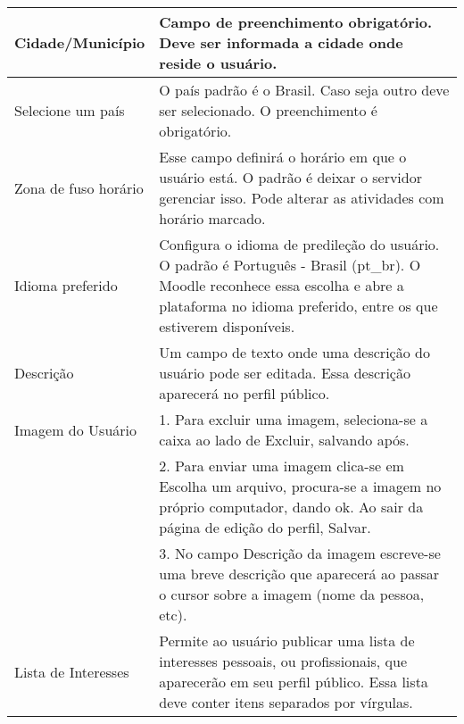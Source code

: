 \begin{longtable}{p{4cm}|p{9cm}}
%  
%  
 Cidade/Município & Campo de preenchimento obrigatório. Deve ser informada a cidade onde reside o usuário. \\\hline
    Selecione um país & O país padrão é o Brasil. Caso seja outro deve ser selecionado. O preenchimento é obrigatório. \\\hline
    Zona de fuso horário & Esse campo definirá o horário em que o usuário está. O padrão é deixar o servidor gerenciar isso. Pode alterar as atividades com horário marcado. \\\hline
    Idioma preferido & Configura o idioma de predileção do usuário. O padrão é Português - Brasil (pt\_br). O Moodle reconhece essa escolha e abre a plataforma no idioma preferido, entre os que estiverem disponíveis. \\\hline
    Descrição  & Um campo de texto onde uma descrição do usuário pode ser editada. Essa descrição aparecerá no perfil público. \\\hline
    Imagem do Usuário & 1. Para excluir uma imagem, seleciona-se a caixa ao lado de Excluir, salvando após.
    \\
    & 2. Para enviar uma imagem clica-se em Escolha um arquivo, procura-se a imagem no próprio computador, dando ok. Ao sair da página de edição do perfil, Salvar. \\
    & 3. No campo Descrição da imagem escreve-se uma breve descrição que aparecerá ao passar o cursor sobre a imagem (nome da pessoa, etc). \\\hline
    Lista de Interesses & Permite ao usuário publicar uma lista de interesses pessoais, ou profissionais, que aparecerão em seu perfil público. Essa lista deve conter itens separados por vírgulas. \\\hline

\end{longtable}
